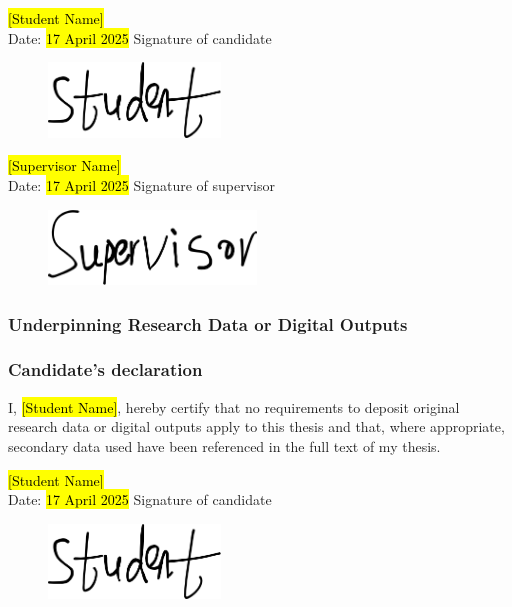 \begin{declaration}
\hspace{13em}\hl{[Student Name]}\\
Date: \hl{17 April 2025} \hspace{4em} Signature of candidate
\vspace{-2.0cm}
\begin{figure}[H]
\hspace{25em}
\includegraphics[height=2cm]{prologue/signatures/student-sig.png}
\end{figure}

\hspace{13em}\hl{[Supervisor Name]}\\
Date: \hl{17 April 2025} \hspace{4em} Signature of supervisor
\vspace{-2.0cm}
\begin{figure}[H]
\hspace{25em}
\includegraphics[height=2cm]{prologue/signatures/supervisor-sig.png}
\end{figure}

\newpage
\subsubsection*{Underpinning Research Data or Digital Outputs}
\subsubsection*{Candidate's declaration}
I, \hl{[Student Name]}, hereby certify that no requirements to deposit original research data or digital outputs apply to this thesis and that, where appropriate, secondary data used have been referenced in the full text of my thesis.

\vspace{48pt}

\hspace{13em}\hl{[Student Name]}\\
Date: \hl{17 April 2025} \hspace{4em} Signature of candidate
\vspace{-2.0cm}
\begin{figure}[H]
\hspace{25em}
\includegraphics[height=2cm]{prologue/signatures/student-sig.png}
\end{figure}

\end{declaration}